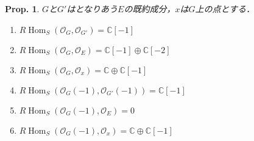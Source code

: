 \documentclass[uplatex,a4paper,11pt,dvipdfmx]{jsarticle}
\theoremstyle{mystyle} %
\newtheorem{proposition}{Prop.}[section]
\DeclareMathOperator{\Hom}{Hom}
\begin{document}
\begin{proposition}
	$G$と$G'$はとなりあう$E$の既約成分，$x$は$G$上の点とする．
	\begin{enumerate}
		\item $R\Hom_S(\mathcal{O}_G, \mathcal{O}_{G'}) = \mathbb{C}[-1]$
		\item $R\Hom_S(\mathcal{O}_G, \mathcal{O}_E) = \mathbb{C}[-1]\oplus\mathbb{C}[-2]$
		\item $R\Hom_S(\mathcal{O}_G, \mathcal{O}_x) = \mathbb{C}\oplus\mathbb{C}[-1]$
		\item $R\Hom_S(\mathcal{O}_G(-1), \mathcal{O}_{G'}(-1)) = \mathbb{C}[-1]$
		\item $R\Hom_S(\mathcal{O}_G(-1), \mathcal{O}_E) = 0$
		\item $R\Hom_S(\mathcal{O}_G(-1), \mathcal{O}_x) = \mathbb{C}\oplus\mathbb{C}[-1]$
	\end{enumerate}
\end{proposition}
\end{document}
